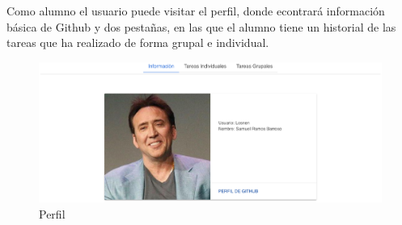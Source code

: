 Como alumno el usuario puede visitar el perfil, donde econtrará información básica de Github y dos pestañas, en las que el alumno tiene un historial de las tareas que ha realizado de forma grupal e individual.

\begin{figure}[!th]
\begin{center}
\includegraphics[scale=0.5]{images/profile}
\caption{Perfil}
\label{fig:Perfil}
\end{center}
\end{figure}

